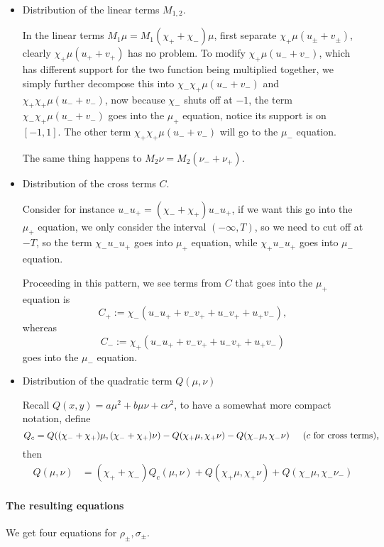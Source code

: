 \documentclass[letterpaper,11pt]{article}
\numberwithin{equation}{section}
\theoremstyle{plain}
\begin{document}
\begin{itemize}
\item Distribution of the linear terms $M_{1,2}$.

In the linear terms $M_1 \mu = M_1 (\chi_++\chi_-)\mu  $, first separate $\chi_+\mu(u_{\pm}+v_{\pm})$, clearly $\chi_+\mu(u_+ + v_+)$ has no problem. To modify $\chi_+\mu(u_-+v_-)$, which has different support for the two function being multiplied together, we simply further decompose this into $\chi_-\chi_+\mu(u_-+v_-)$ and $\chi_+\chi_+\mu(u_-+v_-)$, now because $\chi_-$ shuts off at $-1$, the term $\chi_- \chi_+\mu(u_-+v_-)$ goes into the $\mu_+$ equation, notice its support is on $[-1,1]$. The other term $\chi_+\chi_+\mu(u_-+v_-)$ will go to the $\mu_-$ equation.

The same thing happens to $M_2\nu = M_2(\nu_-+\nu_+)$.

\item Distribution of the cross terms $C$.

Consider for instance $u_-u_+ = (\chi_-+\chi_+)u_-u_+$, if we want this go into the $\mu_+$ equation, we only consider the interval $(-\infty,T)$, so we need to cut off at $-T$, so the term $\chi_- u_-u_+$ goes into $\mu_+$ equation, while $\chi_+u_-u_+$ goes into $\mu_-$ equation.

Proceeding in this pattern, we see terms from $C$ that goes into the $\mu_+$ equation is
\[
C_+:=\chi_-(u_-u_++v_-v_++u_-v_++u_+v_-),
\]
whereas
\[
C_-:=\chi_+(u_-u_++v_-v_++u_-v_++u_+v_-)
\]
goes into the $\mu_-$ equation.

\item Distribution of the quadratic term $Q(\mu,\nu)$

Recall $Q(x,y)=a\mu^2+b\mu\nu+c\nu^2$, to have a somewhat more compact notation, define 
\[
Q_c = Q((\chi_-+\chi_+)\mu,(\chi_-+\chi_+)\nu)-Q(\chi_+\mu,\chi_+\nu)-Q(\chi_-\mu,\chi_-\nu) \hspace{0.2in} \text{($c$ for cross terms),}
\]
 then
\begin{align*}
Q(\mu,\nu) &=(\chi_++\chi_-)Q_c(\mu,\nu)+Q(\chi_+\mu,\chi_+\nu)+Q(\chi_-\mu,\chi_-\nu_-)
\end{align*}


\end{itemize}

\paragraph{The resulting equations}

We get four equations for $\rho_{\pm}, \sigma_{\pm}$.
\end{document}
